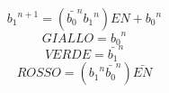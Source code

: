 \begin{equation}
{b_1}^{n+1} = ({\bar{b_0}}^{n} {b_1}^{n}) EN + {b_0}^{n}
\label{e:eq2}
\end{equation}
\begin{equation}
GIALLO = {b_0}^{n}
\label{e:eq3}
\end{equation}
\begin{equation}
VERDE = {\bar{b_1}}^{n}
\label{e:eq4}
\end{equation}
\begin{equation}
ROSSO = ({b_1}^{n} {\bar{b_0}}^{n}) \bar{EN}
\label{e:eq5}
\end{equation}


